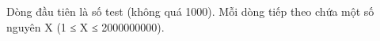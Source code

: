 Dòng đầu tiên là số test (không quá 1000). Mỗi dòng tiếp theo chứa một số nguyên X (1 ≤ X ≤ 2000000000).  

\